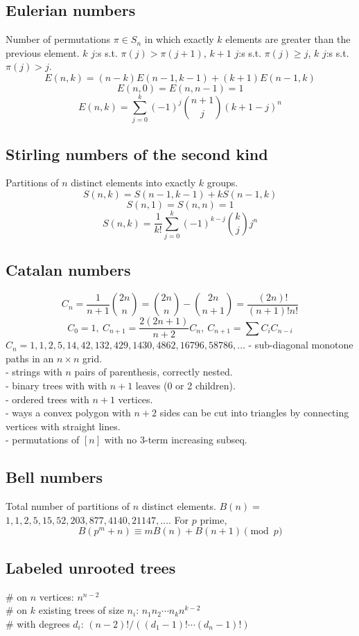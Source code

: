   \subsection{Eulerian numbers}
    Number of permutations $\pi \in S_n$ in which exactly $k$ elements are greater than the previous element. $k$ $j$:s s.t. $\pi(j)>\pi(j+1)$, $k+1$ $j$:s s.t. $\pi(j)\geq j$, $k$ $j$:s s.t. $\pi(j)>j$.
    $$E(n,k) = (n-k)E(n-1,k-1) + (k+1)E(n-1,k)$$
    $$E(n,0) = E(n,n-1) = 1$$
    $$E(n,k) = \sum_{j=0}^k(-1)^j\binom{n+1}{j}(k+1-j)^n$$

  \subsection{Stirling numbers of the second kind}
    Partitions of $n$ distinct elements into exactly $k$ groups.
    $$S(n,k) = S(n-1,k-1) + k S(n-1,k)$$
    $$S(n,1) = S(n,n) = 1$$
    $$S(n,k) = \frac{1}{k!}\sum_{j=0}^k (-1)^{k-j}\binom{k}{j}j^n$$

  \subsection{Catalan numbers}
    \[ C_n=\frac{1}{n+1}\binom{2n}{n}= \binom{2n}{n}-\binom{2n}{n+1} = \frac{(2n)!}{(n+1)!n!} \]
    \[ C_0=1,\ C_{n+1} = \frac{2(2n+1)}{n+2}C_n,\ C_{n+1}=\sum C_iC_{n-i} \]
    ${C_n = 1, 1, 2, 5, 14, 42, 132, 429, 1430, 4862, 16796, 58786, \dots}$
    - sub-diagonal monotone paths in an $n\times n$ grid.                                                           \\
    - strings with $n$ pairs of parenthesis, correctly nested.                                                      \\
    - binary trees with with $n+1$ leaves (0 or 2 children).                                                        \\
    - ordered trees with $n+1$ vertices.                                                                            \\
    - ways a convex polygon with $n+2$ sides can be cut into triangles by connecting vertices with straight lines.  \\
    - permutations of $[n]$ with no 3-term increasing subseq.

  \subsection{Bell numbers}
    Total number of partitions of $n$ distinct elements. $B(n) =$
    $1, 1, 2, 5, 15, 52, 203, 877, 4140, 21147, \dots$. For $p$ prime,
    \[ B(p^m+n)\equiv mB(n)+B(n+1) \pmod{p} \]

  \subsection{Labeled unrooted trees}
    \# on $n$ vertices: $n^{n-2}$ \\
    \# on $k$ existing trees of size $n_i$: $n_1n_2\cdots n_k n^{k-2}$ \\
    \# with degrees $d_i$: $(n-2)! / ((d_1-1)! \cdots (d_n-1)!)$
